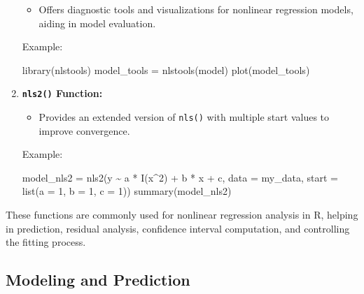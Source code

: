 \documentclass[
]{article}
\newenvironment{Shaded}{}{}
\newcommand{\AttributeTok}[1]{\textcolor[rgb]{0.49,0.56,0.16}{#1}}
\newcommand{\DecValTok}[1]{\textcolor[rgb]{0.25,0.63,0.44}{#1}}
\newcommand{\FunctionTok}[1]{\textcolor[rgb]{0.02,0.16,0.49}{#1}}
\newcommand{\NormalTok}[1]{#1}
\newcommand{\OtherTok}[1]{\textcolor[rgb]{0.00,0.44,0.13}{#1}}
\newcommand{\SpecialCharTok}[1]{\textcolor[rgb]{0.25,0.44,0.63}{#1}}
\begin{document}
\begin{enumerate}
  \begin{itemize}
  \item
    Offers diagnostic tools and visualizations for nonlinear regression
    models, aiding in model evaluation.
  \end{itemize}

  Example:

\begin{Shaded}
\begin{Highlighting}[]
\FunctionTok{library}\NormalTok{(nlstools)}
\NormalTok{model\_tools }\OtherTok{=} \FunctionTok{nlstools}\NormalTok{(model)}
\FunctionTok{plot}\NormalTok{(model\_tools)}
\end{Highlighting}
\end{Shaded}
\item
  \textbf{\texttt{nls2()} Function:}

  \begin{itemize}
  \item
    Provides an extended version of \texttt{nls()} with multiple start
    values to improve convergence.
  \end{itemize}

  Example:

\begin{Shaded}
\begin{Highlighting}[]
\NormalTok{model\_nls2 }\OtherTok{=} \FunctionTok{nls2}\NormalTok{(y }\SpecialCharTok{\textasciitilde{}}\NormalTok{ a }\SpecialCharTok{*} \FunctionTok{I}\NormalTok{(x}\SpecialCharTok{\^{}}\DecValTok{2}\NormalTok{) }\SpecialCharTok{+}\NormalTok{ b }\SpecialCharTok{*}\NormalTok{ x }\SpecialCharTok{+}\NormalTok{ c, }\AttributeTok{data =}\NormalTok{ my\_data, }\AttributeTok{start =} \FunctionTok{list}\NormalTok{(}\AttributeTok{a =} \DecValTok{1}\NormalTok{, }\AttributeTok{b =} \DecValTok{1}\NormalTok{, }\AttributeTok{c =} \DecValTok{1}\NormalTok{))}
\FunctionTok{summary}\NormalTok{(model\_nls2)}
\end{Highlighting}
\end{Shaded}
\end{enumerate}

These functions are commonly used for nonlinear regression analysis in
R, helping in prediction, residual analysis, confidence interval
computation, and controlling the fitting process.

\hypertarget{modeling-and-prediction}{%
\subsection{Modeling and Prediction}\label{modeling-and-prediction}}
\end{document}
